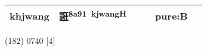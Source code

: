 \documentclass[14pt,a4paper]{scrartcl}
\begin{document}
\begin{longtable}[c]{@{}llllll@{}}
\begin{minipage}[t]{0.14\columnwidth}\raggedright\strut
khjwang
\strut\end{minipage} &
\begin{minipage}[t]{0.14\columnwidth}\raggedright\strut
誑\textsuperscript{8a91~kjwangH}
\strut\end{minipage} &
\begin{minipage}[t]{0.14\columnwidth}\raggedright\strut
\strut\end{minipage} &
\begin{minipage}[t]{0.14\columnwidth}\raggedright\strut
\strut\end{minipage} &
\begin{minipage}[t]{0.14\columnwidth}\raggedright\strut
pure:B
\strut\end{minipage}\tabularnewline
\bottomrule
\end{longtable}

(182) 0740 {[}4{]}
\end{document}
